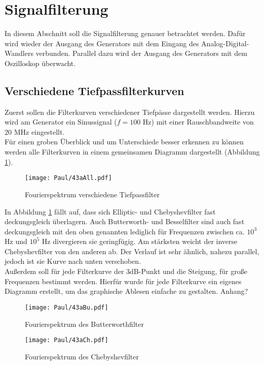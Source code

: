 \section{Signalfilterung}
In diesem Abschnitt soll die Signalfilterung genauer betrachtet werden. Dafür wird wieder der Ausgang des Generators mit dem Eingang des Analog-Digital-Wandlers verbunden. Parallel dazu wird der Ausgang des Generators mit dem Oszilloskop überwacht.

\subsection{Verschiedene Tiefpassfilterkurven}
Zuerst sollen die Filterkurven verschiedener Tiefpässe dargestellt werden. Hierzu wird am Generator ein Sinussignal ($f=100$ Hz) mit einer Rauschbandweite von 20 MHz eingestellt.\\

Für einen groben Überblick und um Unterschiede besser erkennen zu können werden alle Filterkurven in einem gemeinsamen Diagramm dargestellt (Abbildung \ref{fig:43aAll}). \\

\begin{figure}[h]
    \centering
    \texttt{[image: Paul/43aAll.pdf]}
    \caption{Fourierspektrum verschiedene Tiefpassfilter}
    \label{fig:43aAll}
\end{figure}

In Abbildung \ref{fig:43aAll} fällt auf, dass sich Elliptic- und Chebyshevfilter fast deckungsgleich überlagern. Auch Butterworth- und Besselfilter sind auch fast deckungsgleich mit den oben genannten lediglich für Frequenzen zwischen ca. $10^3$ Hz und $10^5$ Hz divergieren sie geringfügig. Am stärksten weicht der inverse Chebyshevfilter von den anderen ab. Der Verlauf ist sehr ähnlich, nahezu parallel, jedoch ist sie Kurve nach unten verschoben. \\

\newpage
Außerdem soll  für jede Filterkurve der 3dB-Punkt und die Steigung, für große Frequenzen bestimmt werden.
Hierfür wurde für jede Filterkurve ein eigenes Diagramm erstellt, um das graphische Ablesen einfache zu gestalten.
Anhang?


\begin{figure}[h]
    \centering
    \texttt{[image: Paul/43aBu.pdf]}
    \caption{Fourierspektrum des Butterworthfilter}
\end{figure}


\begin{figure}[h]
    \centering
    \texttt{[image: Paul/43aCh.pdf]}
    \caption{Fourierspektrum des Chebyshevfilter}
\end{figure}

